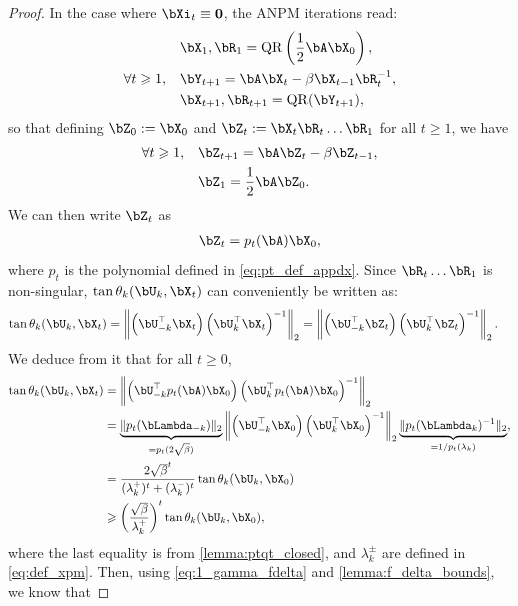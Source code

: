 \documentclass{article}
\theoremstyle{plain}
\theoremstyle{definition}
\theoremstyle{remark}
\begin{document}
\begin{proof}

In the case where $\bXi_t \equiv \mathbf{0}$, the ANPM iterations read:
\begin{align*}
  & \bX_1, \bR_1 = \mathrm{QR}\left(\frac{1}{2}\bA \bX_0\right), \\
  \forall t \geqslant 1, \quad & \bY_{t+1} = \bA \bX_t - \beta \bX_{t-1} \bR_t^{-1}, \\
  & \bX_{t+1}, \bR_{t+1} = \mathrm{QR}(\bY_{t+1}),
\end{align*}
so that defining $\bZ_0 := \bX_0$ and $\bZ_t := \bX_t\bR_t \dots \bR_1$ for all $t\geqslant 1$, we have
\begin{align*}
  \forall t \geqslant 1, \quad & \bZ_{t+1} = \bA \bZ_t - \beta \bZ_{t-1}, \\
  & \bZ_1 = \frac{1}{2}\bA\bZ_0.
\end{align*}
We can then write $\bZ_t$ as
\begin{align*}
  \bZ_t = p_t(\bA) \bX_0,
\end{align*}
where $p_t$ is the polynomial defined in \eqref{eq:pt_def_appdx}. Since $\bR_t\dots\bR_1$ is non-singular, $\tan \theta_k(\bU_k, \bX_t)$ can conveniently be written as:
\begin{align*}
  \tan\theta_k(\bU_k,\bX_t) & = \left\Vert \left(\bU_{-k}^\top \bX_t\right) \left(\bU_k^\top \bX_t\right)^{-1} \right\Vert_2 = \left\Vert \left(\bU_{-k}^\top \bZ_t\right) \left(\bU_k^\top \bZ_t\right)^{-1} \right\Vert_2.
\end{align*}
We deduce from it that for all $t\geqslant 0$,
\begin{align*}
  \tan\theta_k(\bU_k,\bX_t) & = \left\Vert \left(\bU_{-k}^\top p_t(\bA) \bX_0\right) \left(\bU_k^\top p_t(\bA) \bX_0\right)^{-1} \right\Vert_2 \\
  & = \underbrace{\Vert p_t(\bLambda_{-k})\Vert_2}_{= p_t(2\sqrt{\beta})} \left\Vert \left(\bU_{-k}^\top \bX_0\right) \left(\bU_k^\top \bX_0\right)^{-1} \right\Vert_2 \underbrace{\Vert p_t(\bLambda_k)^{-1} \Vert_2}_{=1/p_t(\lambda_k)}, \\
  & = \frac{2\sqrt{\beta}^t}{(\lambda_k^+)^t + (\lambda_k^{-})^t} \tan \theta_k(\bU_k, \bX_0)\\
  & \geqslant\left(\frac{\sqrt{\beta}}{\lambda_k^+}\right)^t \tan \theta_k(\bU_k, \bX_0),
\end{align*}
where the last equality is from \cref{lemma:ptqt_closed}, and $\lambda_k^\pm$ are defined in \eqref{eq:def_xpm}. Then, using \eqref{eq:1_gamma_fdelta} and \cref{lemma:f_delta_bounds}, we know that

\end{proof}
\end{document}
